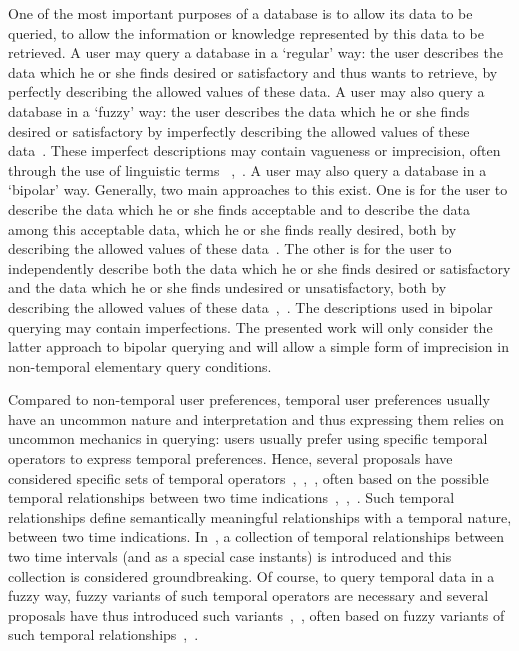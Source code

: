 \documentclass[runningheads,a4paper]{llncs}
\begin{document}
One of the most important purposes of a database is to allow its data to be queried, to allow the information or knowledge represented by this data to be retrieved. A user may query a database in a `regular' way: the user describes the data which he or she finds desired or satisfactory and thus wants to retrieve, by perfectly describing the allowed values of these data. A user may also query a database in a `fuzzy' way: the user describes the data which he or she finds desired or satisfactory by imperfectly describing the allowed values of these data~\cite{Zadrozny2008hrfipd}. These imperfect descriptions may contain vagueness or imprecision, often through the use of linguistic terms ~\cite{Devos1998jql},~\cite{Kacprzyk2001is}. A user may also query a database in a `bipolar' way. Generally, two main approaches to this exist. One is for the user to describe the data which he or she finds acceptable and to describe the data among this acceptable data, which he or she finds really desired, both by describing the allowed values of these data~\cite{Dubois2002lnai}. The other is for the user to independently describe both the data which he or she finds desired or satisfactory and the data which he or she finds undesired or unsatisfactory, both by describing the allowed values of these data~\cite{DeTre2010ieeetfs},~\cite{Matthe2011ijis}. The descriptions used in bipolar querying may contain imperfections. The presented work will only consider the latter approach to bipolar querying and will allow a simple form of imprecision in non-temporal elementary query conditions.

Compared to non-temporal user preferences, temporal user preferences usually have an uncommon nature and interpretation and thus expressing them relies on uncommon mechanics in querying: users usually prefer using specific temporal operators to express temporal preferences. Hence, several proposals have considered specific sets of temporal operators~\cite{Galindo2001},~\cite{Pons2012ijcis},~\cite{Schockaert2008ieeetfs}, often based on the possible temporal relationships between two time indications~\cite{Galindo2001},~\cite{Pons2012ijcis},~\cite{Schockaert2008ieeetfs}. Such temporal relationships define semantically meaningful relationships with a temporal nature, between two time indications. In~\cite{Allen1983cacm}, a collection of temporal relationships between two time intervals (and as a special case instants) is introduced and this collection is considered groundbreaking. Of course, to query temporal data in a fuzzy way, fuzzy variants of such temporal operators are necessary and several proposals have thus introduced such variants~\cite{Galindo2001},~\cite{Pons2012ipmu}, often based on fuzzy variants of such temporal relationships~\cite{Schockaert2008ieeetfs},~\cite{Pons2013ijufkbs}.
\end{document}
